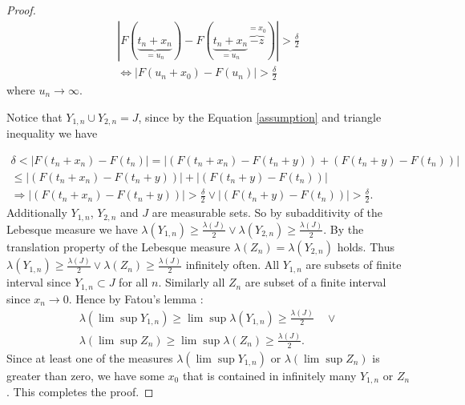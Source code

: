 \documentclass[english,12pt,a4paper,pdftex,sci,utf8]{aaltothesis} %
\begin{document}
\begin{proof}
\begin{equation*}
\begin{split}
\left| F(\underbrace{t_n+x_n}_{=u_n})-F(\underbrace{t_n+x_n}_{=u_n}\overbrace{-z}^{=x_0}) \right| > \frac{\delta}{2} \\
\Leftrightarrow \left| F(u_n+x_0)-F(u_n) \right| > \frac{\delta}{2}
\end{split}
\end{equation*}
where $u_n \rightarrow \infty$.

Notice that $Y_{1,n} \cup Y_{2,n}=J$, since by the Equation \eqref{assumption} and triangle inequality we have

\begin{equation*}
\begin{split}
\delta < \left| F(t_n+x_n) - F(t_n) \right| = \left| (F(t_n+x_n)-F(t_n+y)) + (F(t_n+y)-F(t_n)) \right| \\
\leq \left| (F(t_n+x_n)-F(t_n+y)) \right| + \left| (F(t_n+y)-F(t_n)) \right| \\
\Rightarrow \left| (F(t_n+x_n)-F(t_n+y)) \right|>\frac{\delta}{2} \lor \left| (F(t_n+y)-F(t_n)) \right|>\frac{\delta}{2}.
\end{split}
\end{equation*}
Additionally $Y_{1,n}$, $Y_{2,n}$ and $J$ are measurable sets. So by subadditivity of the Lebesque measure we have $\lambda(Y_{1,n}) \geq \frac{\lambda(J)}{2} \lor \lambda(Y_{2,n}) \geq \frac{\lambda(J)}{2}$. By the translation property of the Lebesque measure $\lambda(Z_n)=\lambda(Y_{2,n})$ holds. Thus $\lambda(Y_{1,n}) \geq \frac{\lambda(J)}{2} \lor \lambda(Z_n) \geq \frac{\lambda(J)}{2}$ infinitely often. All $Y_{1,n}$ are subsets of finite interval since $Y_{1,n} \subset J$ for all $n$. Similarly all $Z_n$ are subset of a finite interval since $x_n \rightarrow 0$. Hence by Fatou's lemma \cite{lahiri}:
\begin{equation*}
\begin{split}
\lambda(\lim \sup Y_{1,n}) \geq \lim \sup \lambda(Y_{1,n}) \geq \frac{\lambda(J)}{2}  \quad \lor \\
\lambda(\lim \sup Z_{n}) \geq \lim \sup \lambda(Z_{n}) \geq \frac{\lambda(J)}{2}.
\end{split}
\label{fatouapply}
\end{equation*}
Since at least one of the measures $\lambda(\lim \sup Y_{1,n})$ or $\lambda(\lim \sup Z_{n})$ is greater than zero, we have some $x_0$ that is contained in infinitely many $Y_{1,n}$ or $Z_n$. This completes the proof.
\end{proof}
\end{document}
